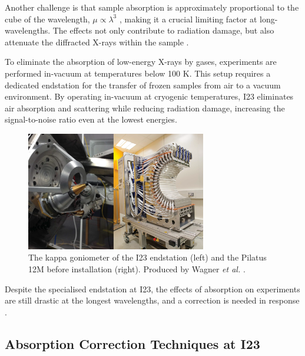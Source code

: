  Another challenge is that sample absorption is approximately proportional to the cube of the wavelength, $\mu \propto \lambda^3$ \cite{Arndt1984}, making it a crucial limiting factor at long-wavelengths. The effects not only contribute to radiation damage, but also attenuate the diffracted X-rays within the sample \cite{Wagner2016}.

To eliminate the absorption of low-energy X-rays by gases, experiments are performed in-vacuum at temperatures below 100 K. This setup requires a dedicated endstation for the transfer of frozen samples from air to a vacuum environment. By operating in-vacuum at cryogenic temperatures, I23 eliminates air absorption and scattering while reducing radiation damage, increasing the signal-to-noise ratio even at the lowest energies.

\begin{figure}
    \centering
    \includegraphics[width = 0.7\textwidth]{images/goniometer&detector.PNG}
    \caption{The kappa goniometer of the I23 endstation (left) and the Pilatus 12M before installation (right). Produced by Wagner \textit{et al.} \cite{Wagner2016}.}
    \label{fig:gonio_and_detector}
\end{figure}


Despite the specialised endstation at I23, the effects of absorption on experiments are still drastic at the longest wavelengths, and a correction is needed in response \cite{Kazantsev2021}.

\subsection{Absorption Correction Techniques at I23}


